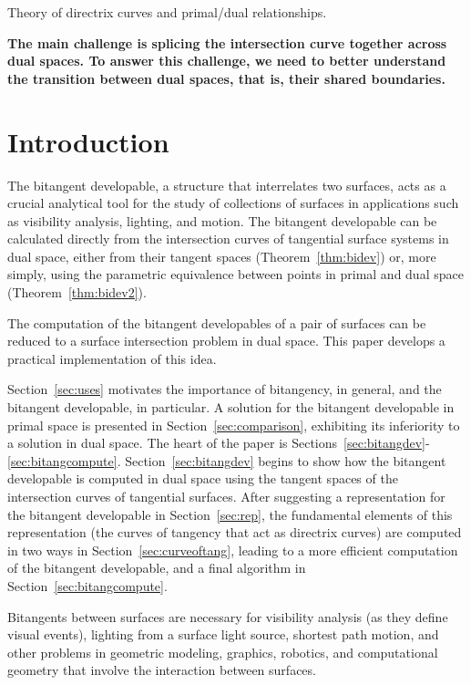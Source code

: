 \documentclass[12pt]{article}
\begin{document}
Theory of directrix curves and primal/dual relationships.

{\bf The main challenge is splicing the intersection curve together across
dual spaces.
To answer this challenge, 
we need to better understand the transition between dual spaces,
that is, their shared boundaries.}


\clearpage

\section{Introduction}

The bitangent developable, a structure that interrelates two surfaces,
acts as a crucial analytical tool for the study of collections
of surfaces in applications such as visibility analysis, lighting, and motion.
The bitangent developable can be calculated directly 
from the intersection curves of tangential surface systems in dual space,
either from their tangent spaces (Theorem~\ref{thm:bidev})
or, more simply, using the parametric equivalence between points in primal
and dual space (Theorem~\ref{thm:bidev2}).


The computation of the bitangent developables of a pair of surfaces
can be reduced to a surface intersection problem in dual space.
This paper develops a practical implementation of this idea.

Section~\ref{sec:uses} motivates the importance of bitangency, in general,
and the bitangent developable, in particular.
A solution for the bitangent developable in primal space is presented
in Section~\ref{sec:comparison}, exhibiting its inferiority to a solution in dual
space.
The heart of the paper is Sections~\ref{sec:bitangdev}-\ref{sec:bitangcompute}.
Section~\ref{sec:bitangdev} begins to show how the bitangent developable
is computed in dual space using the tangent spaces of the intersection curves
of tangential surfaces.
After suggesting a representation for the bitangent developable in
Section~\ref{sec:rep},
the fundamental elements of this representation (the curves of tangency
that act as directrix curves) are computed in two ways in 
Section~\ref{sec:curveoftang}, 
leading to a more efficient computation of the bitangent developable,
and a final algorithm in Section~\ref{sec:bitangcompute}.

Bitangents between surfaces are necessary for visibility analysis
(as they define visual events), lighting from a surface light source,
shortest path motion, and other problems in geometric modeling,
graphics, robotics, and computational geometry that involve the
interaction between surfaces.
\end{document}
